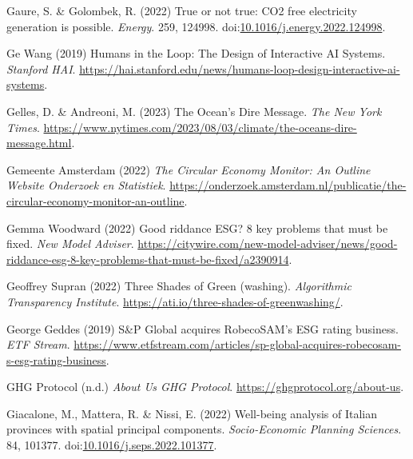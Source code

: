 \documentclass[
  letterpaper,
  DIV=11,
  numbers=noendperiod]{scrartcl}
\newlength{\cslhangindent}
\newenvironment{CSLReferences}[2] %
 {\begin{list}{}{%
  \setlength{\itemindent}{0pt}
  \setlength{\leftmargin}{0pt}
  \setlength{\parsep}{0pt}
  \ifodd #1
   \setlength{\leftmargin}{\cslhangindent}
   \setlength{\itemindent}{-1\cslhangindent}
  \fi
  \setlength{\itemsep}{#2\baselineskip}}}
 {\end{list}}
\begin{document}
\begin{CSLReferences}{0}{1}
Gaure, S. \& Golombek, R. (2022) True or not true: {CO2} free
electricity generation is possible. \emph{Energy}. 259, 124998.
doi:\href{https://doi.org/10.1016/j.energy.2022.124998}{10.1016/j.energy.2022.124998}.

Ge Wang (2019) Humans in the {Loop}: {The Design} of {Interactive AI
Systems}. \emph{Stanford HAI}.
\url{https://hai.stanford.edu/news/humans-loop-design-interactive-ai-systems}.

Gelles, D. \& Andreoni, M. (2023) The {Ocean}'s {Dire Message}.
\emph{The New York Times}.
\url{https://www.nytimes.com/2023/08/03/climate/the-oceans-dire-message.html}.

Gemeente Amsterdam (2022) \emph{{The Circular Economy Monitor: An
Outline {\textbar} Website Onderzoek en Statistiek}}.
\url{https://onderzoek.amsterdam.nl/publicatie/the-circular-economy-monitor-an-outline}.

Gemma Woodward (2022) Good riddance {ESG}? 8 key problems that must be
fixed. \emph{New Model Adviser}.
\url{https://citywire.com/new-model-adviser/news/good-riddance-esg-8-key-problems-that-must-be-fixed/a2390914}.

Geoffrey Supran (2022) Three {Shades} of {Green} (washing).
\emph{Algorithmic Transparency Institute}.
\url{https://ati.io/three-shades-of-greenwashing/}.

George Geddes (2019) S\&{P Global} acquires {RobecoSAM}'s {ESG} rating
business. \emph{ETF Stream}.
\url{https://www.etfstream.com/articles/sp-global-acquires-robecosam-s-esg-rating-business}.

GHG Protocol (n.d.) \emph{About {Us} {\textbar} {GHG Protocol}}.
\url{https://ghgprotocol.org/about-us}.

Giacalone, M., Mattera, R. \& Nissi, E. (2022) Well-being analysis of
{Italian} provinces with spatial principal components.
\emph{Socio-Economic Planning Sciences}. 84, 101377.
doi:\href{https://doi.org/10.1016/j.seps.2022.101377}{10.1016/j.seps.2022.101377}.


\end{CSLReferences}
\end{document}
